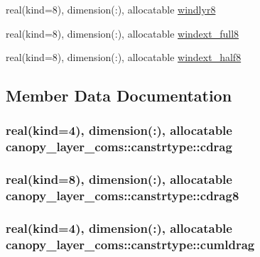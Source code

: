 \begin{DoxyCompactItemize}
\item 
real(kind=8), dimension(\+:), allocatable \hyperlink{structcanopy__layer__coms_1_1canstrtype_ad29af3fcb9a0ed4dc4985eb8f1714283}{windlyr8}
\item 
real(kind=8), dimension(\+:), allocatable \hyperlink{structcanopy__layer__coms_1_1canstrtype_a3181c359a50b42145fcc853de4f37613}{windext\+\_\+full8}
\item 
real(kind=8), dimension(\+:), allocatable \hyperlink{structcanopy__layer__coms_1_1canstrtype_a42b218a7ffe018a0a4f6e753471ff11d}{windext\+\_\+half8}
\end{DoxyCompactItemize}


\subsection{Member Data Documentation}
\subsubsection[{\texorpdfstring{cdrag}{cdrag}}]{\setlength{\rightskip}{0pt plus 5cm}real(kind=4), dimension(\+:), allocatable canopy\+\_\+layer\+\_\+coms\+::canstrtype\+::cdrag}\hypertarget{structcanopy__layer__coms_1_1canstrtype_a5ae1b10bcffa38619368cfa76a022c4e}{}\label{structcanopy__layer__coms_1_1canstrtype_a5ae1b10bcffa38619368cfa76a022c4e}
\subsubsection[{\texorpdfstring{cdrag8}{cdrag8}}]{\setlength{\rightskip}{0pt plus 5cm}real(kind=8), dimension(\+:), allocatable canopy\+\_\+layer\+\_\+coms\+::canstrtype\+::cdrag8}\hypertarget{structcanopy__layer__coms_1_1canstrtype_a3a3de790a580c68fd8a4f826c5f3f315}{}\label{structcanopy__layer__coms_1_1canstrtype_a3a3de790a580c68fd8a4f826c5f3f315}
\subsubsection[{\texorpdfstring{cumldrag}{cumldrag}}]{\setlength{\rightskip}{0pt plus 5cm}real(kind=4), dimension(\+:), allocatable canopy\+\_\+layer\+\_\+coms\+::canstrtype\+::cumldrag}\hypertarget{structcanopy__layer__coms_1_1canstrtype_affa32f59db639149948370654c88a4a8}{}\label{structcanopy__layer__coms_1_1canstrtype_affa32f59db639149948370654c88a4a8}
